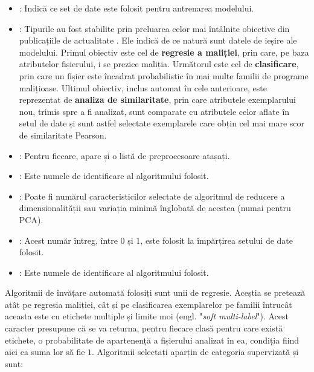 \documentclass[../../main.tex]{subfiles}
\begin{document}
\begin{itemize}
    \item {}: Indică ce set de date este folosit pentru antrenarea mode\-lului.
    \item {}: Tipurile au fost stabilite prin preluarea celor mai întâlnite obiective din publicațiile de actualitate \cite{ml_malware_survey}. Ele indică de ce natură sunt datele de ieșire ale modelului. Primul obiectiv este cel de \textbf{regresie a maliției}, prin care, pe baza atributelor fișierului, i se prezice maliția. Următorul este cel de \textbf{clasificare}, prin care un fișier este încadrat probabilistic în mai multe familii de programe malițioase. Ultimul obiectiv, inclus automat în cele anterioare, este reprezentat de \textbf{analiza de similaritate}, prin care atributele exemplarului nou, trimis spre a fi ana\-lizat, sunt comparate cu atributele celor aflate în setul de date și sunt astfel selectate exemplarele care obțin cel mai mare scor de similaritate Pearson.
    \item {}: Pentru fiecare, apare și o listă de preprocesoare atașați.
    \item {}: Este numele de identificare al algoritmului folosit.
    \item {}: Poate fi numărul caracteristicilor selectate de algoritmul de reducere a dimensionalității sau variația minimă înglobată de acestea (numai pentru PCA).
    \item {}: Acest număr întreg, între $ 0 $ și $ 1 $, este folosit la împărțirea setului de date folosit.
    \item {}: Este numele de identificare al algoritmului folosit.
\end{itemize}

Algoritmii de învățare automată folosiți sunt unii de regresie. Aceștia se pretează atât pe regresia maliției, cât și pe clasificarea exemplarelor pe familii întrucât aceasta este cu etichete multiple și limite moi (engl. "\textit{soft multi-label}"). Acest caracter presupune că se va returna, pentru fiecare clasă pentru care există etichete, o probabilitate de apartenență a fișierului analizat în ea, condiția fiind aici ca suma lor să fie $ 1 $. Algoritmii selectați aparțin de categoria supervizată și sunt:
\end{document}
